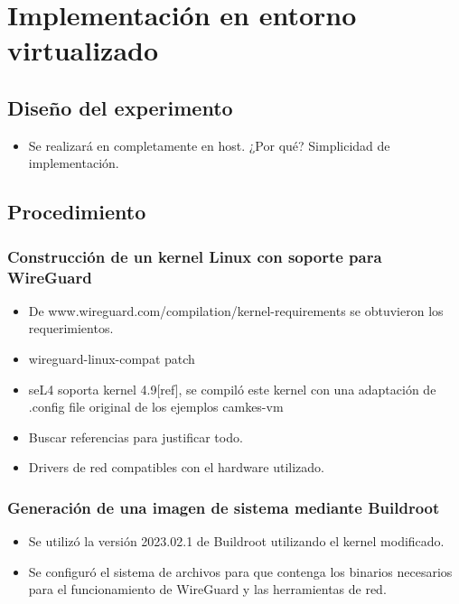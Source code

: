 \chapter{Implementación en entorno virtualizado} %

\section{Diseño del experimento}
\begin{itemize}
    \item Se realizará en completamente en host. ¿Por qué? Simplicidad de implementación.
\end{itemize}
\section{Procedimiento} %
  
\subsection{Construcción de un kernel Linux con soporte para WireGuard}
\begin{itemize}
    \item De www.wireguard.com/compilation/kernel-requirements se obtuvieron los requerimientos.
    \item wireguard-linux-compat patch
    \item seL4 soporta kernel 4.9[ref], se compiló este kernel con una adaptación de .config file original de los ejemplos camkes-vm
    \item Buscar referencias para justificar todo. \cite{Laricch2009AAMOP_ICBp3}

    \item Drivers de red compatibles con el hardware utilizado.
\end{itemize}

\subsection{Generación de una imagen de sistema mediante Buildroot}
\begin{itemize}
    \item Se utilizó la versión 2023.02.1 de Buildroot utilizando el kernel modificado.
    \item Se configuró el sistema de archivos para que contenga los binarios necesarios para el funcionamiento de WireGuard y las herramientas de red.
\end{itemize}

